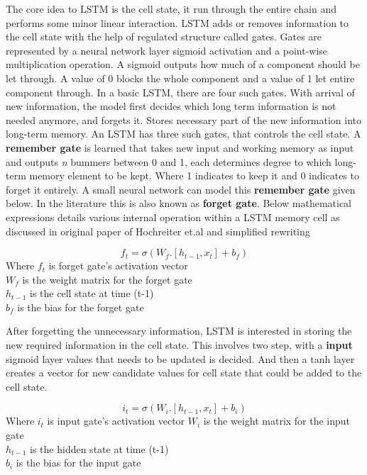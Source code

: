 The core idea to LSTM is the cell state, it run through the entire chain and performs some minor linear interaction. LSTM adds or removes information to the cell state with the help of regulated structure called gates. Gates are represented by a neural network layer sigmoid activation and a point-wise multiplication operation.
A sigmoid outputs how much of a component should be let through. A value of 0 blocks the whole component and a value of 1 let entire component through. In a basic LSTM, there are four such gates.
With arrival of new information, the model first decides which long term information is not needed anymore, and forgets it. Stores necessary part of the new information into long-term memory. An LSTM has three such gates, that controls the cell state.
A \textbf{remember gate} is learned that takes new input and working memory as input and outputs \textit{n} bummers between 0 and 1, each determines degree to which long-term memory element to be kept. Where 1 indicates to keep it and 0 indicates to forget it entirely. A small neural network can model this \textbf{remember gate} given below. In the literature this is also known as \textbf{forget gate}. Below mathematical expressions details various internal operation within a LSTM memory cell as discussed in original paper of Hochreiter et.al \cite{hochreiter1997long} and simplified rewriting \cite{christopherolah}

\begin{equation}
f_t = \sigma(W_f. [h_{t-1}, x_t  ] + b_f)
\end{equation}
Where $f_t$ is forget gate's activation vector \\
$W_f$ is the weight matrix for the forget gate \\
$h_{t-1}$ is the cell state at time (t-1) \\
$b_f$ is the bias for the forget gate

After forgetting the unnecessary information, LSTM is interested in storing the new required information in the cell state. This involves two step, with a \textbf{input} sigmoid layer values that needs to be updated is decided. And then a tanh layer creates a vector for new candidate values for cell state that could be added to the cell state. 

\begin{equation}
i_t = \sigma(W_i. [h_{t-1}, x_t  ] + b_i)
\end{equation}
Where $i_t$ is input gate's activation vector 
$W_i$ is the weight matrix for the input gate \\
$h_{t-1}$ is the hidden state at time (t-1) \\
$b_i$ is the bias for the input gate

